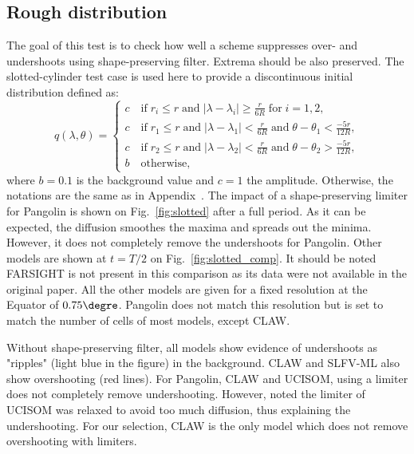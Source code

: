 \subsection{Rough distribution}
The goal of this test is to check how well a scheme suppresses over- and
undershoots using shape-preserving filter. Extrema should be also preserved.
The slotted-cylinder test case is used here to provide a discontinuous initial
distribution defined as:
\begin{equation}
  q(\lambda, \theta) = 
  \begin{cases}
    c \quad \text{if} \; r_i \le r \; \text{and} \; 
    |\lambda-\lambda_i| \ge \frac{r}{6R} \; \text{for} \; i=1,2,\\
    c \quad \text{if} \; r_1 \le r \; \text{and} \; 
    |\lambda-\lambda_1| < \frac{r}{6R} \; \text{and} \; 
    \theta-\theta_1 < \frac{-5r}{12R},\\
    c \quad \text{if} \; r_2 \le r \; \text{and} \; 
    |\lambda-\lambda_2| < \frac{r}{6R} \; \text{and} \; 
    \theta-\theta_2 > \frac{-5r}{12R},\\
    b \quad \text{otherwise},
  \end{cases}
\end{equation}
where $b=0.1$ is the background value and $c=1$ the amplitude. Otherwise, the
notations are the same as in Appendix~\DIFdelbegin \DIFdel{\ref{sec:tests}}\DIFdelend \DIFaddbegin \DIFadd{\ref{sec2:tests}}\DIFaddend .  The impact of a
shape-preserving limiter for Pangolin is shown on Fig.~\ref{fig:slotted} after a
full period. As it can be expected, the diffusion smoothes the maxima and
spreads out the minima. However, it does not completely remove the undershoots
for Pangolin.  Other models are shown at $t=T/2$ on Fig.~\ref{fig:slotted_comp}.
It should be noted FARSIGHT is not present in this comparison as its data were
not available in the original paper. All the other models are given for a fixed
resolution at the Equator of $0.75\degre$. Pangolin does not match this
resolution but is set to match the number of cells of most models, except CLAW.

Without shape-preserving filter, all models show evidence of undershoots as "ripples"
(light blue in the figure) in the background. CLAW and SLFV-ML also show overshooting (red
lines). For Pangolin, CLAW and UCISOM, using a limiter does not
completely remove undershooting. However, \cite{Lauritzen2014} noted the
limiter of UCISOM was relaxed to avoid too much diffusion, thus explaining the
undershooting.
For our selection, CLAW is the only model which does not remove overshooting
with limiters.

